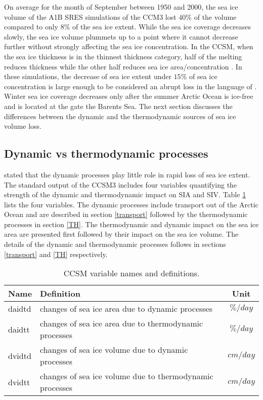  


On average for the month of September between 1950 and 2000, the sea ice volume of the A1B SRES simulations of the CCM3 lost $40\%$ of the volume compared to only $8\%$ of the sea ice extent. While the sea ice coverage decreases slowly, the sea ice volume plummets up to a point where it cannot decrease further without strongly affecting the sea ice concentration. In the CCSM, when the sea ice thickness is in the thinnest thickness category, half of the melting reduces thickness while the other half reduces sea ice area/concentration \citep{Hunke:2008ly}. In these simulations, the decrease of sea ice extent under $15\%$ of sea ice concentration is large enough to be considered an abrupt loss in the language of \cite{ISI:000242942100008}. Winter sea ice coverage decreases only after the summer Arctic Ocean is ice-free and is located at the gate the Barents Sea. The next section discusses the differences between the dynamic and the thermodynamic sources of sea ice volume loss. 

\subsection{Dynamic vs thermodynamic processes}\label{DvsT}

\cite{ISI:000242942100008} stated that the dynamic processes play little role in rapid loss of sea ice extent. The standard output of the CCSM3 includes four variables quantifying the strength of the dynamic and thermodynamic impact on SIA and SIV. Table \ref{vardt} lists the four variables. The dynamic processes include transport out of the Arctic Ocean and are described in section \ref{transport} followed by the thermodynamic processes in section \ref{TH}. The thermodynamic and dynamic impact on the sea ice area are presented first followed by their impact on the sea ice volume. The details of the dynamic and thermodynamic processes follows in sections \ref{transport} and \ref{TH} respectively.
\begin{table}[H]
\centering
\begin{tabular}{l | l | c}
\hline
 Name  & Definition & Unit \\
\hline
  daidtd  & 	changes of sea ice area due to dynamic processes 	& $\% / day$  \\
  daidtt  &    changes of sea ice area due to thermodynamic processes				& $\% / day$  \\
  dvidtd  &    changes of sea ice volume due to dynamic processes	& $cm / day$\\
  dvidtt & 	changes of sea ice volume due to thermodynamic processes & $cm / day$
\end{tabular}
\caption{CCSM variable names and definitions.} \label{vardt}
\end{table}

